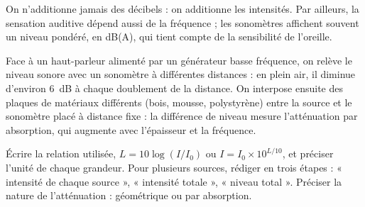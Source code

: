 \begin{attention}
On n'additionne jamais des décibels : on additionne les intensités. Par ailleurs, la sensation auditive dépend aussi de
la fréquence ; les sonomètres affichent souvent un niveau pondéré, en dB(A), qui tient compte de la sensibilité de
l'oreille.
\end{attention}
\begin{experience}
Face à un haut-parleur alimenté par un générateur basse fréquence, on relève le niveau sonore avec un sonomètre à
différentes distances : en plein air, il diminue d'environ \qty{6}{dB} à chaque doublement de la distance. On interpose
ensuite des plaques de matériaux différents (bois, mousse, polystyrène) entre la source et le sonomètre placé à
distance fixe : la différence de niveau mesure l'atténuation par absorption, qui augmente avec l'épaisseur et la
fréquence.
\end{experience}
\begin{rediger}
Écrire la relation utilisée, $L=10\log(I/I_0)$ ou $I=I_0\times10^{L/10}$, et préciser l'unité de chaque grandeur. Pour
plusieurs sources, rédiger en trois étapes : « intensité de chaque source », « intensité totale », « niveau total ».
Préciser la nature de l'atténuation : géométrique ou par absorption.
\end{rediger}
\exercices

